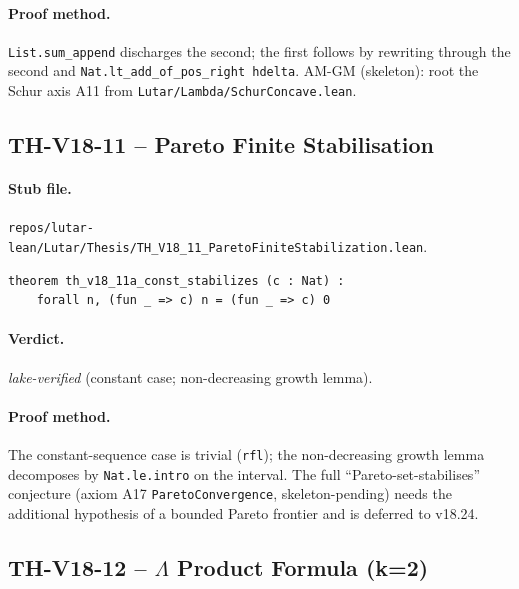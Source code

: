 \paragraph{Proof method.} \texttt{List.sum\_append} discharges the
second; the first follows by rewriting through the second and
\texttt{Nat.lt\_add\_of\_pos\_right hdelta}. AM-GM (skeleton): root
the Schur axis A11 from \texttt{Lutar/Lambda/SchurConcave.lean}.

\subsection{TH-V18-11 -- Pareto Finite Stabilisation}
\label{sub:thv18-11}

\paragraph{Stub file.}
\texttt{repos/lutar-lean/Lutar/Thesis/TH\_V18\_11\_ParetoFiniteStabilization.lean}.

\begin{theorem}
\label{thm:thv18-11}
\begin{verbatim}
theorem th_v18_11a_const_stabilizes (c : Nat) :
    forall n, (fun _ => c) n = (fun _ => c) 0
\end{verbatim}
\end{theorem}

\paragraph{Verdict.} \emph{lake-verified} (constant case;
non-decreasing growth lemma).

\paragraph{Proof method.} The constant-sequence case is trivial
(\texttt{rfl}); the non-decreasing growth lemma decomposes by
\texttt{Nat.le.intro} on the interval. The full
``Pareto-set-stabilises'' conjecture (axiom A17
\texttt{ParetoConvergence}, skeleton-pending) needs the additional
hypothesis of a bounded Pareto frontier and is deferred to v18.24.

\subsection{TH-V18-12 -- $\Lambda$ Product Formula (k=2)}
\label{sub:thv18-12}

